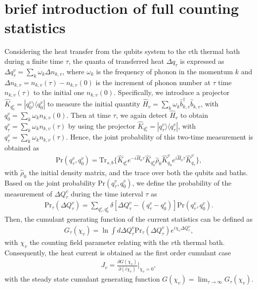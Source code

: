 \documentclass[twocolumn,preprintnumbers,amsmath,amssymb]{revtex4}
\begin{document}
\section{brief introduction of full counting statistics}
Considering the heat transfer from the qubits system to the $v$th thermal bath during a finite time $\tau$,
the quanta of transferred heat $\Delta{q}_{\tau}$ is expressed as ${\Delta}q^v_{\tau}=\sum_k\omega_k\Delta{n_{k,v}}$,
where $\omega_k$ is the frequency of phonon in the momentum $k$
and $\Delta{n}_{k,v}=n_{k,v}(\tau)-n_{k,v}(0)$ is the increment of phonon number at $\tau$ time $n_{k,v}(\tau)$
to the initial one $n_{k,v}(0)$.
Specifically, we introduce a projector $\hat{K}_{q^v_{0}}=|q^v_0{\rangle}{\langle}q^v_0|$ to measure the initial quantity
$\hat{H}_v=\sum_{k}\omega_k\hat{b}^{\dag}_{k,v}\hat{b}_{k,v}$, with $q^v_0=\sum_k\omega_kn_{k,v}(0)$.
Then at time $\tau$, we again detect $\hat{H}_v$ to obtain $q^v_{\tau}=\sum_k\omega_kn_{k,v}(\tau)$ by using
the projector $\hat{K}_{q^v_{\tau}}=|q^v_{\tau}{\rangle}{\langle}q^v_{\tau}|$, with $q^v_{\tau}=\sum_k\omega_kn_{k,v}(\tau)$.
Hence, the joint probability of this two-time measurement is obtained as~\cite{mesposito2009rmp}
\begin{eqnarray}
\textrm{Pr}(q^v_{\tau},q^v_0)=\textrm{Tr}_{s,b}\{\hat{K}_{q^v_{\tau}}e^{-i\hat{H}_0\tau}\hat{K}_{q^v_0}\hat{\rho}_0\hat{K}^v_{q_0}
e^{i\hat{H}_0\tau}\hat{K}^v_{q_{\tau}}\},
\end{eqnarray}
with $\hat{\rho}_0$ the initial density matrix, and the trace over both the qubits and baths.
Based on the joint probability $\textrm{Pr}(q^v_{\tau},q^v_0)$, we define the probability of the measurement of $\Delta{Q}^v_{\tau}$ during the time interval $\tau$ as
\begin{eqnarray}
\textrm{Pr}_{\tau}(\Delta{Q}^v_{\tau})=\sum_{q^v_{\tau},q^v_0}\delta[\Delta{Q}^v_{\tau}-(q^v_{\tau}-q^v_0)]\textrm{Pr}(q^v_{\tau},q^v_0).
\end{eqnarray}
Then, the cumulant generating function of the current statistics can be defined as
\begin{eqnarray}
G_{\tau}(\chi_v)=\ln{\int{d\Delta{Q}^v_{\tau}}\textrm{Pr}_{\tau}(\Delta{Q}^v_{\tau})e^{i\chi_v\Delta{Q}^v_{\tau}}},
\end{eqnarray}
with $\chi_v$ the counting field parameter relating with the $v$th thermal bath.
Consequently, the heat current is obtained as the first order cumulant case
\begin{eqnarray}
J_v=\frac{{\partial}G(\chi_v)}{{\partial}(i\chi_v)}|_{\chi_v=0},
\end{eqnarray}
with the steady state cumulant generating function $G(\chi_v)=\lim_{\tau{\rightarrow}\infty}G_{\tau}(\chi_v)$.
\end{document}
